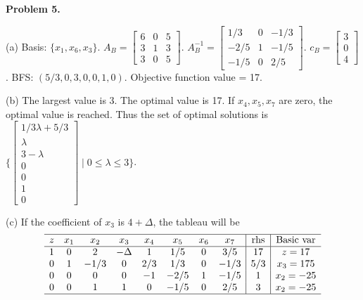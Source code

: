 \documentclass[12pt]{article}
\begin{document}
\vspace{\baselineskip}
\noindent
\textbf{Problem 5.}

(a) Basis: $\{x_1,x_6,x_3\}$. $A_B =\begin{bmatrix}6 & 0 & 5 \\ 3 & 1 & 3 \\ 3 & 0 & 5\end{bmatrix} $. $A_B^{-1} = \begin{bmatrix}1/3 & 0 & -1/3 \\ -2/5 & 1 & -1/5 \\ -1/5 & 0 & 2/5\end{bmatrix}$. $c_B=\begin{bmatrix}3 \\ 0 \\ 4\end{bmatrix}$. BFS: $(5/3,0,3,0,0,1,0)$. Objective function value = 17.

(b) The largest value is 3. The optimal value is 17. If $x_4,x_5,x_7$ are zero, the optimal value is reached. Thus the set of optimal solutions is $\{\begin{bmatrix}1/3\lambda+5/3 \\ \lambda \\3-\lambda \\0 \\ 0 \\1 \\0 \end{bmatrix} \mid 0 \le \lambda \le 3\}$.

(c)
If the coefficient of $x_3$ is $4+\Delta$, the tableau will be
\begin{equation*}
  \begin{array}{cccccccc|c|c}
    \hline
    z &  x_1      &  x_2 &  x_3 &  x_4 & x_5 & x_6 & x_7 &   \text{rhs} & \text{Basic var}   \\ \hline
    1 &    0     &    2 &    -\Delta &    1 & 1/5    & 0 & 3/5 & 17      &  z=17              \\
    0 &    1      &    -1/3 &    0 &    2/3 &    1/3 & 0 & -1/3 & 5/3        &  x_3 = 175         \\
    0 &    0      &    0 &    0 &    -1 &    -2/5 & 1 & -1/5 & 1       &  x_2 = -25           \\
    0 &    0      &    1 &    1 &    0 &    -1/5 & 0 & 2/5 & 3       &  x_2 = -25           \\ \hline
  \end{array}
\end{equation*}
\end{document}
